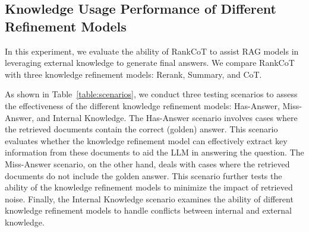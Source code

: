 



\subsection{Knowledge Usage Performance of Different Refinement Models}
In this experiment, we evaluate the ability of RankCoT to assist RAG models in leveraging external knowledge to generate final answers. We compare RankCoT with three knowledge refinement models: Rerank, Summary, and CoT.

As shown in Table~\ref{table:scenarios}, we conduct three testing scenarios to assess the effectiveness of the different knowledge refinement models: Has-Answer, Miss-Answer, and Internal Knowledge. The Has-Answer scenario involves cases where the retrieved documents contain the correct (golden) answer. This scenario evaluates whether the knowledge refinement model can effectively extract key information from these documents to aid the LLM in answering the question. The Miss-Answer scenario, on the other hand, deals with cases where the retrieved documents do not include the golden answer. This scenario further tests the ability of the knowledge refinement models to minimize the impact of retrieved noise. Finally, the Internal Knowledge scenario examines the ability of different knowledge refinement models to handle conflicts between internal and external knowledge.

